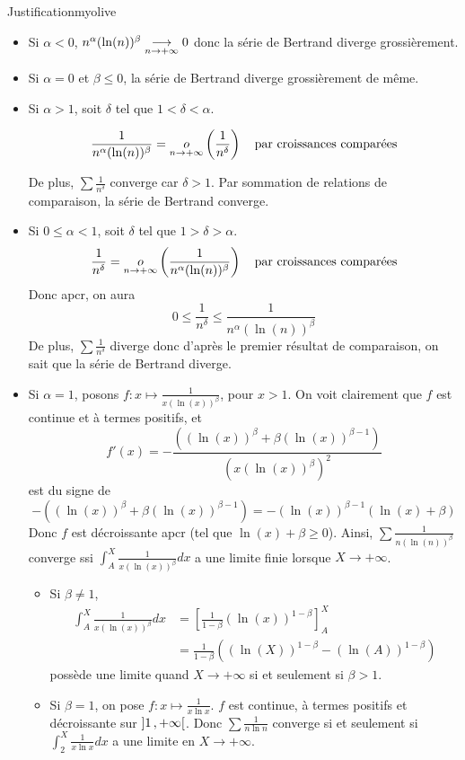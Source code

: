     \begin{demo}{Justification}{myolive}
        \begin{itemize}
            \item Si $\alpha < 0$, $n^{\alpha}(\ln(n))^{\beta} \limi{n}{+\infty} 0$ donc la série de Bertrand diverge grossièrement.
            \item Si $\alpha = 0$ et $\beta \leq 0$, la série de Bertrand diverge grossièrement de même.
            \item Si $\alpha > 1$, soit $\delta$ tel que $1 < \delta < \alpha$.
            
            \[ \frac{1}{n^{\alpha} (\ln(n))^{\beta}} = \limit{o}{n}{+\infty} \left(\frac{1}{n^{\delta}}\right) \quad \text{par croissances comparées} \] 

            De plus, $\sum \frac{1}{n^{\delta}}$ converge car $\delta > 1$. Par sommation de relations de comparaison, la série de Bertrand converge.
            \item Si $0 \leq \alpha < 1$, soit $\delta$ tel que $1 > \delta > \alpha$.
            \[ \frac{1}{n^{\delta}} = \limit{o}{n}{+\infty} \left(\frac{1}{n^{\alpha} (\ln(n))^{\beta}}\right) \quad \text{par croissances comparées} \]
            Donc apcr, on aura 
            \[ 0 \leq \frac{1}{n^{\delta}} \leq \frac{1}{n^{\alpha} (\ln(n))^{\beta}} \]
            De plus, $\sum \frac{1}{n^{\delta}}$ diverge donc d’après le premier résultat de comparaison, on sait que la série de Bertrand diverge.
            \item Si $\alpha = 1$, posons $f : x \longmapsto \frac{1}{x(\ln(x))^{\beta}}$, pour $x > 1$. On voit clairement que $f$ est continue et à termes positifs, et 
            \[ f'(x) = -\frac{\left((\ln(x))^{\beta} + \beta (\ln(x))^{\beta-1}\right)}{ \left(x(\ln(x))^{\beta}\right)^2} \] 
            est du signe de 
            \[ -\left((\ln(x))^{\beta} + \beta (\ln(x))^{\beta-1}\right) = -(\ln(x))^{\beta-1} (\ln(x) + \beta) \] 
            Donc $f$ est décroissante apcr (tel que $\ln(x) + \beta \geq 0$). Ainsi, $\sum \frac{1}{n(\ln(n))^{\beta}}$ converge ssi $\int_{A}^{X} \frac{1}{x(\ln(x))^{\beta}} dx $ a une limite finie lorsque $X \rightarrow +\infty$.
            \begin{itemize}
                \item Si $\beta \neq 1$, 
                \begin{align*}
                    \int_{A}^{X} \frac{1}{x(\ln(x))^{\beta}} dx 
                    &= \left[\frac{1}{1-\beta} (\ln(x))^{1 - \beta}\right]_A^X \\
                    &= \frac{1}{1- \beta}\left((\ln(X))^{1-\beta} - (\ln(A))^{1-\beta}\right)
                \end{align*}
                possède une limite quand $X \rightarrow +\infty$ si et seulement si $\beta > 1$.
                \item Si $\beta = 1$, on pose $f : x \mapsto \frac{1}{x \ln x}$. $f$ est continue, à termes positifs et décroissante sur $\intervalleOO{1}{+\infty}$. Donc $ \sum \frac{1}{n \ln n}$ converge si et seulement si $\int_{2}^{X} \frac{1}{x \ln x}dx$ a une limite en $X \rightarrow +\infty$. 
                

\end{itemize}
\end{itemize}
\end{demo}

